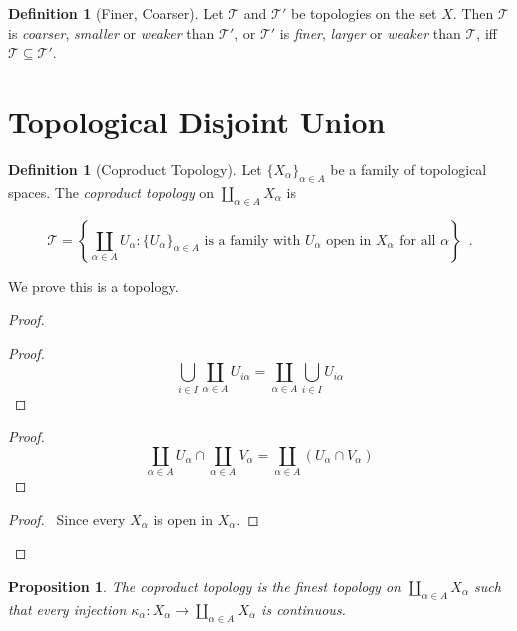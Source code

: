 \documentclass{book}
\let\qed\relax
\newtheorem{prop}[ax]{Proposition}
\theoremstyle{definition}
\newtheorem{df}[ax]{Definition}
\begin{document}
\begin{df}[Finer, Coarser]
Let $\mathcal{T}$ and $\mathcal{T}'$ be topologies on the set $X$. Then $\mathcal{T}$ is \emph{coarser}, \emph{smaller} or \emph{weaker} than $\mathcal{T}'$, or $\mathcal{T}'$ is \emph{finer}, \emph{larger} or \emph{weaker} than $\mathcal{T}$, iff $\mathcal{T} \subseteq \mathcal{T}'$.
\end{df}

\section{Topological Disjoint Union}

\begin{df}[Coproduct Topology]
Let $\{ X_\alpha \}_{\alpha \in A}$ be a family of topological spaces. The \emph{coproduct topology} on $\coprod_{\alpha \in A} X_\alpha$ is 

\[ \mathcal{T} = \left\{ \coprod_{\alpha \in A} U_\alpha : \{ U_\alpha \}_{\alpha \in A} \text{ is a family with $U_\alpha$ open in $X_\alpha$ for all $\alpha$} \right\} \enspace . \]

We prove this is a topology.
\end{df}

\begin{proof}
\pf
{}
\begin{proof}
	\pf
	\[ \bigcup_{i \in I} \coprod_{\alpha \in A} U_{i\alpha} = \coprod_{\alpha \in A} \bigcup_{i \in I} U_{i \alpha} \]
\end{proof}
\begin{proof}
	\pf
	\[ \coprod_{\alpha \in A} U_\alpha \cap \coprod_{\alpha \in A} V_\alpha = \coprod_{\alpha \in A} (U_\alpha \cap V_\alpha) \]
\end{proof}
\begin{proof}
	\pf\ Since every $X_\alpha$ is open in $X_\alpha$.
\end{proof}
\qed
\end{proof}

\begin{prop}
\label{prop:coproduct_finest}
The coproduct topology is the finest topology on $\coprod_{\alpha \in A} X_\alpha$ such that every injection $\kappa_\alpha : X_\alpha \rightarrow \coprod_{\alpha \in A} X_\alpha$ is continuous.
\end{prop}
\end{document}
